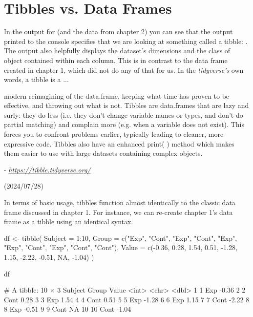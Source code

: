 \section{Tibbles vs. Data Frames}

In the output for  (and the  data from chapter 2) you can see that the output printed to the console specifies that we are looking at something called a \gls{tibble}: . The output also helpfully displays the dataset's dimensions and the class of object contained within each column. This is in contrast to the data frame created in chapter 1, which did not do any of that for us. In the \textit{tidyverse's} own words, a tibble is a ...

\begin{displayquote}
\headingfont
modern reimagining of the data.frame, keeping what time has proven to be effective, and throwing out what is not. Tibbles are data.frames that are lazy and surly: they do less (i.e. they don’t change variable names or types, and don’t do partial matching) and complain more (e.g. when a variable does not exist). This forces you to confront problems earlier, typically leading to cleaner, more expressive code. Tibbles also have an enhanced print( ) method which makes them easier to use with large datasets containing complex objects.

- \textit{\url{https://tibble.tidyverse.org/}}

\vspace{-1em}
(2024/07/28)

\end{displayquote}

In terms of basic usage, tibbles function almost identically to the classic data frame discussed in chapter 1. For instance, we can re-create chapter 1's data frame as a tibble using an identical syntax.

\begin{inR}
df <- tibble(
  Subject = 1:10,
  Group = c("Exp", "Cont", "Exp", "Cont", "Exp", "Exp",
            "Cont", "Exp", "Cont", "Cont"),
  Value = c(-0.36,  0.28,  1.54,  0.51, -1.28,  1.15,
            -2.22, -0.51,  NA, -1.04)
)

df
\end{inR}

\begin{outR}
# A tibble: 10 × 3
   Subject Group Value
     <int> <chr> <dbl>
 1       1 Exp   -0.36
 2       2 Cont   0.28
 3       3 Exp    1.54
 4       4 Cont   0.51
 5       5 Exp   -1.28
 6       6 Exp    1.15
 7       7 Cont  -2.22
 8       8 Exp   -0.51
 9       9 Cont  NA   
10      10 Cont  -1.04
\end{outR}

